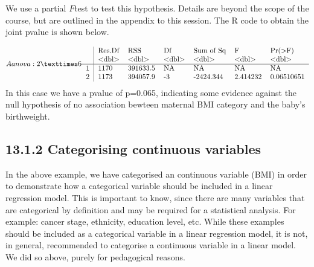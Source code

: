 \documentclass[letterpaper,10pt,english]{jupyterBook}
\begin{document}
\sphinxAtStartPar
We use a partial \(F\)\sphinxhyphen{}test to test this hypothesis. Details are beyond the scope of the course, but are outlined in the appendix to this session. The R code to obtain the joint p\sphinxhyphen{}value is shown below.

\begin{sphinxVerbatim}[commandchars=\\\{\}]
 

 
\end{sphinxVerbatim}
\begin{equation*}
\begin{split}A anova: 2 × 6
\begin{tabular}{r|llllll}
  & Res.Df & RSS & Df & Sum of Sq & F & Pr(>F)\\
  & <dbl> & <dbl> & <dbl> & <dbl> & <dbl> & <dbl>\\
\hline
	1 & 1170 & 391633.5 & NA &        NA &       NA &         NA\\
	2 & 1173 & 394057.9 & -3 & -2424.344 & 2.414232 & 0.06510651\\
\end{tabular}\end{split}
\end{equation*}
\sphinxAtStartPar
In this case we have a p\sphinxhyphen{}value of p=0.065, indicating some evidence against the null hypothesis of no association bewteen maternal BMI category and the baby’s birthweight.


\subsection{13.1.2 Categorising continuous variables}
\label{\detokenize{13.b. Linear Regression II:categorising-continuous-variables}}
\sphinxAtStartPar
In the above example, we have categorised an continuous variable (BMI) in order to demonstrate how a categorical variable should be included in a linear regression model. This is important to know, since there are many variables that are categorical by definition and may be required for a statistical analysis. For example: cancer stage, ethnicity, education level, etc. While these examples should be included as a categorical variable in a linear regression model, it is not, in general, recommended to categorise a continuous variable in a linear model. We did so above, purely for pedagogical reasons.
\end{document}

